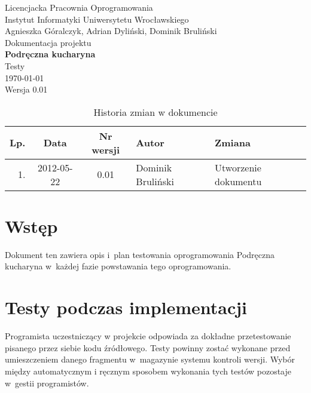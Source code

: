 \documentclass[12pt,leqno, twoside]{mwart}
\begin{document}
\thispagestyle{empty}
\begin{center}
Licencjacka Pracownia Oprogramowania \\ Instytut
Informatyki Uniwersytetu Wrocławskiego \\
\vspace{4cm}
\Large Agnieszka Góralczyk, Adrian Dyliński, Dominik Bruliński \\
\vspace{0.5cm}
\huge Dokumentacja projektu\\ \textbf{Podręczna kucharyna}\\ \Large Testy\\
\vspace{1cm}
\normalsize \today \\
\vspace{2cm}
\normalsize Wersja 0.01
\end{center}

\newpage


\begin{table}
	\centering
	\caption{Historia zmian w dokumencie}
		\begin{tabular}{|r|c|c|l|l|}
		\hline
		Lp. & Data       & Nr wersji & Autor               & Zmiana \\ \hline
		1.   & 2012-05-22 & 0.01 & Dominik Bruliński & Utworzenie dokumentu \\ \hline
		\end{tabular}
\end{table}

\newpage

\tableofcontents
\newpage

\section{Wstęp}
\noindent Dokument ten zawiera opis i~plan testowania oprogramowania Podręczna kucharyna w~każdej fazie powstawania tego
oprogramowania.

\section{Testy podczas implementacji}
\noindent Programista uczestniczący w projekcie odpowiada za dokładne przetestowanie pisanego przez siebie kodu
źródłowego. Testy powinny zostać wykonane przed umieszczeniem danego fragmentu w~magazynie systemu kontroli wersji.
Wybór między automatycznym i ręcznym sposobem wykonania tych testów pozostaje w~gestii programistów.
\end{document}
